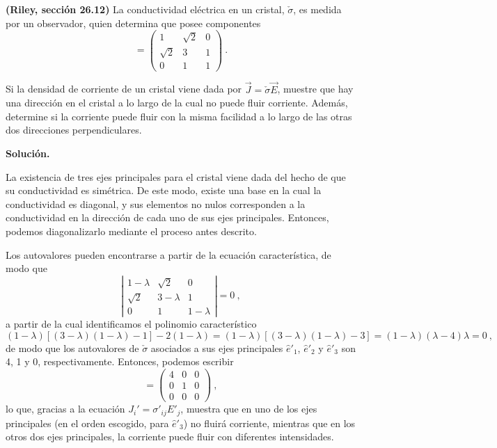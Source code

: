 \begin{ejemplo}
    \textbf{(Riley, sección 26.12)} La conductividad eléctrica en un cristal, $\check{\sigma}$, es medida por un observador, quien determina que posee componentes
    \begin{equation*}
        [\sigma_{ij}] = \begin{pmatrix}
            1 & \sqrt{2} & 0 \\
            \sqrt{2} & 3 & 1 \\
            0 & 1 & 1
        \end{pmatrix} \ .
    \end{equation*}

    Si la densidad de corriente de un cristal viene dada por $\vec{J} = \check{\sigma} \vec{E}$, muestre que hay una dirección en el cristal a lo largo de la cual no puede fluir corriente. Además, determine si  la corriente puede fluir con la misma facilidad a lo largo de las otras dos direcciones perpendiculares.

    \textbf{Solución.} 

    La existencia de tres ejes principales para el cristal viene dada del hecho de que su conductividad es simétrica. De este modo, existe una base en la cual la conductividad es diagonal, y sus elementos no nulos corresponden a la conductividad en la dirección de cada uno de sus ejes principales. Entonces, podemos diagonalizarlo mediante el proceso antes descrito.

    Los autovalores pueden encontrarse a partir de la ecuación característica, de modo que 
    \begin{equation*} \left|
        \begin{array}{ccc}
            1 - \lambda & \sqrt{2} & 0 \\
            \sqrt{2} & 3 - \lambda & 1 \\
            0 & 1 & 1 - \lambda
        \end{array} \right| = 0 \ ,
    \end{equation*}
    a partir de la cual identificamos el polinomio característico
    \begin{equation*}
        (1-\lambda)[(3 - \lambda)(1-\lambda) - 1] - 2(1-\lambda) = (1-\lambda)[(3-\lambda)(1-\lambda) - 3] = (1-\lambda)(\lambda-4)\lambda = 0 \ ,
    \end{equation*}
    de modo que los autovalores de $\check{\sigma}$ asociados a sus ejes principales $\hat{e}'_1$, $\hat{e}'_2$ y $\hat{e}'_3$ son 4, 1 y 0, respectivamente. Entonces, podemos escribir
    \begin{equation*}
        [\sigma'_{ij}] = \begin{pmatrix}
            4 & 0 & 0 \\
            0 & 1 & 0 \\
            0 & 0 & 0 
        \end{pmatrix} \ ,
    \end{equation*}
    lo que, gracias a la ecuación $J_i' = \sigma'_{ij} E'_j$, muestra que en uno de los ejes principales (en el orden escogido, para $\hat{e}'_3$) no fluirá corriente, mientras que en los otros dos ejes principales, la corriente puede fluir con diferentes intensidades. 
\end{ejemplo}

